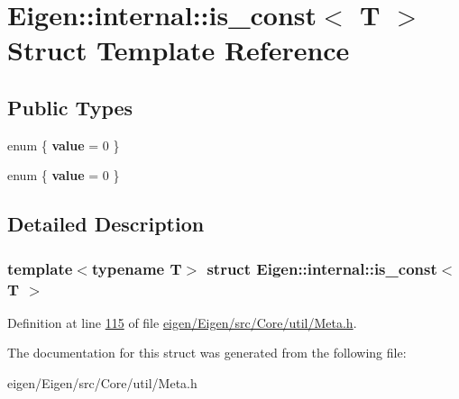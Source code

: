 \hypertarget{struct_eigen_1_1internal_1_1is__const}{}\section{Eigen\+:\+:internal\+:\+:is\+\_\+const$<$ T $>$ Struct Template Reference}
\label{struct_eigen_1_1internal_1_1is__const}
\subsection*{Public Types}
\begin{DoxyCompactItemize}
\item 
\mbox{\label{struct_eigen_1_1internal_1_1is__const_a69cb17c712b8c536b7ae9a7181a760e2}} 
enum \{ {\bfseries value} = 0
 \}
\item 
\mbox{\label{struct_eigen_1_1internal_1_1is__const_aef9940588bd68c549edde3173986c8b1}} 
enum \{ {\bfseries value} = 0
 \}
\end{DoxyCompactItemize}


\subsection{Detailed Description}
\subsubsection*{template$<$typename T$>$\newline
struct Eigen\+::internal\+::is\+\_\+const$<$ T $>$}



Definition at line \hyperlink{eigen_2_eigen_2src_2_core_2util_2_meta_8h_source_l00115}{115} of file \hyperlink{eigen_2_eigen_2src_2_core_2util_2_meta_8h_source}{eigen/\+Eigen/src/\+Core/util/\+Meta.\+h}.



The documentation for this struct was generated from the following file\+:\begin{DoxyCompactItemize}
\item 
eigen/\+Eigen/src/\+Core/util/\+Meta.\+h\end{DoxyCompactItemize}
